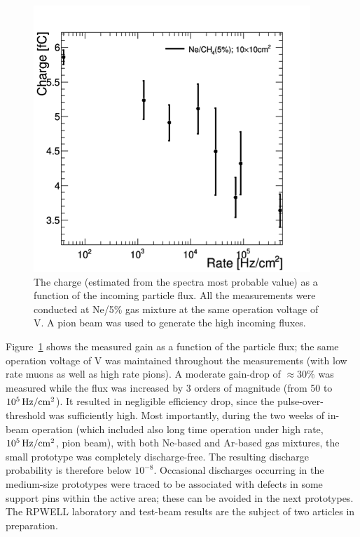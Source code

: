 \begin{figure}
	\includegraphics[width=.9\textwidth]{Calorimeter/THGEM/charge_vs_rate.png}
	\caption{The charge (estimated from the spectra most probable value) as a function of the incoming particle flux.  All the measurements were conducted at Ne/5\% gas mixture at the same operation voltage of \unit[880]{V}. A pion beam was used to generate the high incoming fluxes.}
	\label{fig:Calorimeter:THGEM:chargeVsRate}
\end{figure}
Figure~\ref{fig:Calorimeter:THGEM:chargeVsRate} shows the measured gain as a function of the particle flux; the same operation voltage of \unit[880]{V} was maintained throughout the measurements (with low rate muons as well as high rate pions). A moderate gain-drop of $\approx 30\%$ was measured while the flux was increased by 3 orders of magnitude (from 50 to $\unit[10^5]{Hz/cm^2}$). It resulted in negligible efficiency drop, since the pulse-over-threshold was sufficiently high.
Most importantly, during the two weeks of in-beam operation (which included also long time operation under high rate, $\unit[10^5]{Hz/cm^2}$, pion beam), with both Ne-based and Ar-based gas mixtures, the small prototype was completely discharge-free. The resulting discharge probability is therefore below $10^{-8}$. Occasional discharges occurring in the medium-size prototypes were traced to be associated with defects in some support pins within the active area; these can be avoided in the next prototypes.
The RPWELL laboratory and test-beam results are the subject of two articles in preparation.


